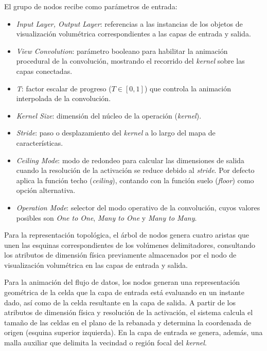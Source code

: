El grupo de nodos recibe como parámetros de entrada:
\begin{itemize}
    \item \textit{Input Layer, Output Layer}: referencias a las instancias de los objetos de 
    visualización volumétrica correspondientes a las capas de entrada y salida.
    \item \textit{View Convolution}: parámetro booleano para habilitar la animación procedural de 
    la convolución, mostrando el recorrido del \textit{kernel} sobre las capas conectadas.
    \item \textit{T}: factor escalar de progreso ($T \in [0, 1]$) que controla la animación 
    interpolada de la convolución.
    \item \textit{Kernel Size}: dimensión del núcleo de la operación (\textit{kernel}).
    \item \textit{Stride}: paso o desplazamiento del \textit{kernel} a lo largo del mapa de 
    características.
    \item \textit{Ceiling Mode}: modo de redondeo para calcular las dimensiones de salida cuando 
    la resolución de la activación se reduce debido al \textit{stride}. Por defecto aplica la función techo 
    (\textit{ceiling}), contando con la función suelo (\textit{floor}) como opción alternativa.
    \item \textit{Operation Mode}: selector del modo operativo de la convolución, cuyos valores 
    posibles son \textit{One to One}, \textit{Many to One} y \textit{Many to Many}.
\end{itemize}

Para la representación topológica, el árbol de nodos genera cuatro aristas que unen las esquinas 
correspondientes de los volúmenes delimitadores, consultando los atributos de dimensión física 
previamente almacenados por el nodo de visualización volumétrica en las capas de entrada y salida.
\medskip

Para la animación del flujo de datos, los nodos generan una representación geométrica de la celda 
que la capa de entrada está evaluando en un instante dado, así como de la celda resultante en la 
capa de salida. A partir de los atributos de dimensión física y resolución de la activación, el sistema 
calcula el tamaño de las celdas en el plano de la rebanada y determina la coordenada de origen 
(esquina superior izquierda). En la capa de entrada se genera, además, una malla auxiliar que delimita 
la vecindad o región focal del \textit{kernel}.
\medskip

